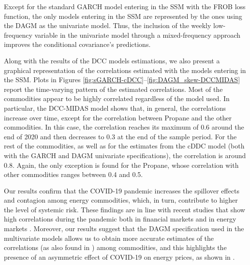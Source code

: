 \begin{paracol}{2}
Except for the standard GARCH model entering in the SSM with the FROB loss function, the only models entering in the SSM are represented by the ones using the DAGM as the univariate model. Thus, the inclusion of the weekly low-frequency variable in the univariate model through a mixed-frequency approach improves the conditional covariance's predictions.

Along with the results of the DCC models estimations, we also present a graphical representation of the correlations estimated with the models entering in the SSM. Plots in Figures \ref{fig:sGARCH-cDCC}--\ref{fig:DAGM_skew-DCCMIDAS} report the time-varying pattern of the estimated correlations.  
Most of the commodities appear to be highly correlated regardless of the model used. In particular, the DCC-MIDAS model shows that, in general, the correlations increase over time, except for the correlation between Propane and the other commodities. In this case, the correlation reaches its maximum of 0.6 around the end of 2020  and then decreases to 0.3 at the end of the sample period. For the rest of the commodities, as well as for the estimates from the cDDC model (both with the GARCH and DAGM univariate specifications), the correlation is around 0.8. Again, the only exception is found for the Propane, whose correlation with other commodities ranges between 0.4 and 0.5. 

{Our results confirm that the COVID-19 pandemic increases the spillover effects and contagion among energy commodities, which, in turn, contribute to higher the level of systemic risk. These findings are in line with recent studies that show high correlations during the pandemic both in financial markets \citep{yousfi2021risk, chevallier2020covid, akhtaruzzaman2021financial, zhang2020financial, zaremba2020infected, corbet2020contagion} and in energy markets \citep{hauser2020impact, nyga2020energy}. Moreover, our results suggest that the DAGM specification used in the multivariate models allows us to obtain more accurate estimates of the correlations (as also found in \citealp{candila2021multivariate}) among commodities, and this highlights the presence of an asymmetric effect of COVID-19 on energy prices, as shown in \cite{wang2021asymmetric}.}


\end{paracol}
